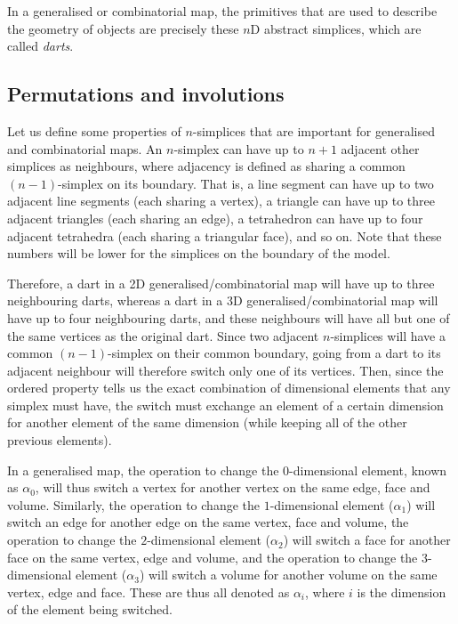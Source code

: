 In a generalised or combinatorial map, the primitives that are used to describe the geometry of objects are precisely these \(n\)D abstract simplices, which are called \emph{darts}.

\subsection{Permutations and involutions}

Let us define some properties of \(n\)-simplices that are important for generalised and combinatorial maps.
An \(n\)-simplex can have up to \(n+1\) adjacent other simplices as neighbours, where adjacency is defined as sharing a common \((n-1)\)-simplex on its boundary.
That is, a line segment can have up to two adjacent line segments (each sharing a vertex), a triangle can have up to three adjacent triangles (each sharing an edge), a tetrahedron can have up to four adjacent tetrahedra (each sharing a triangular face), and so on.
Note that these numbers will be lower for the simplices on the boundary of the model.

Therefore, a dart in a 2D generalised/combinatorial map will have up to three neighbouring darts, whereas a dart in a 3D generalised/combinatorial map will have up to four neighbouring darts, and these neighbours will have all but one of the same vertices as the original dart.
Since two adjacent \(n\)-simplices will have a common \((n-1)\)-simplex on their common boundary, going from a dart to its adjacent neighbour will therefore switch only one of its vertices.
Then, since the ordered property tells us the exact combination of dimensional elements that any simplex must have, the switch must exchange an element of a certain dimension for another element of the same dimension (while keeping all of the other previous elements).

In a generalised map, the operation to change the \(0\)-dimensional element, known as \(\alpha_0\), will thus switch a vertex for another vertex on the same edge, face and volume.
Similarly, the operation to change the \(1\)-dimensional element (\(\alpha_1\)) will switch an edge for another edge on the same vertex, face and volume, the operation to change the \(2\)-dimensional element (\(\alpha_2\)) will switch a face for another face on the same vertex, edge and volume, and the operation to change the \(3\)-dimensional element (\(\alpha_3\)) will switch a volume for another volume on the same vertex, edge and face.
These are thus all denoted as \(\alpha_i\), where \(i\) is the dimension of the element being switched.

